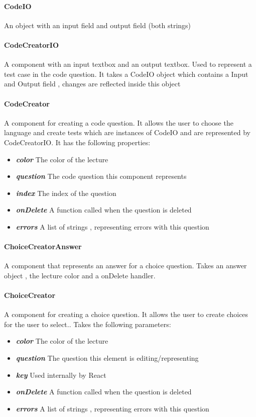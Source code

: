 \paragraph{CodeIO} An object with an input field and output field (both strings)
\paragraph{CodeCreatorIO} A component with an input textbox and an output textbox. Used to represent a test case in the code question. It takes a CodeIO object which contains a Input and Output field , changes are reflected inside this object
\paragraph{CodeCreator} A component for creating a code question. It allows the user to choose the language and create tests which are instances of CodeIO and are represented by CodeCreatorIO. It has the following properties:
\begin{itemize}
	\item \textit{\textbf{color}} The color of the lecture
	\item \textit{\textbf{question}} The code question this component represents
	\item \textit{\textbf{index}} The index of the question
	\item \textit{\textbf{onDelete}} A function called when the question is deleted
	\item \textit{\textbf{errors}} A list of strings , representing errors with this question
\end{itemize}
\paragraph{ChoiceCreatorAnswer} A component that represents an answer for a choice question. Takes an answer object , the lecture color and a onDelete handler.
\paragraph{ChoiceCreator} A component for creating a choice question. It allows the user to create choices for the user to select.. Takes the following parameters:
\begin{itemize}
	\item \textit{\textbf{color}} The color of the lecture
	\item \textit{\textbf{question}} The question this element is editing/representing
	\item \textit{\textbf{key}} Used internally by React
	\item \textit{\textbf{onDelete}} A function called when the question is deleted
	\item \textit{\textbf{errors}} A list of strings , representing errors with this question
\end{itemize}
